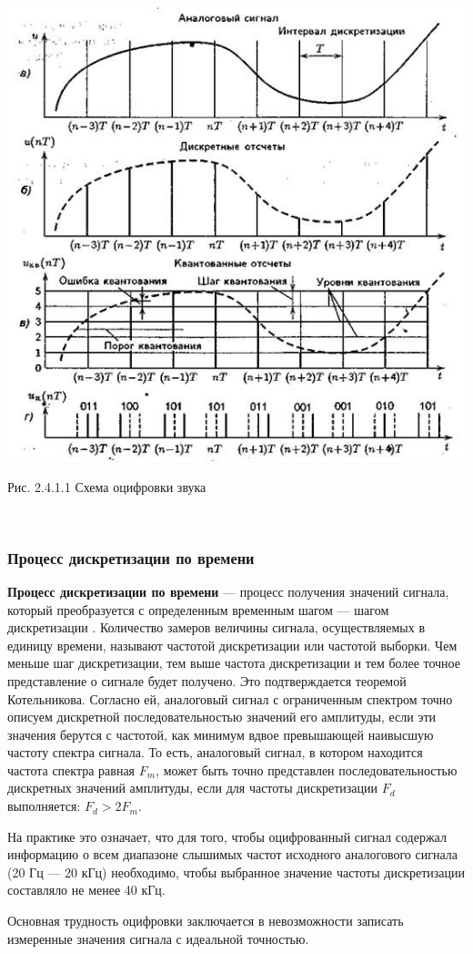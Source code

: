 \documentclass[a4paper]{report}
\begin{document}
~

\includegraphics[scale=0.8]{Analog_to_digi}
{\centering\par{Рис. 2.4.1.1 Схема оцифровки звука}\\}

~
\subsubsection{Процесс дискретизации по времени}
\textbf{Процесс дискретизации по времени} — процесс получения значений сигнала, который преобразуется с определенным временным шагом — шагом дискретизации . Количество замеров величины сигнала, осуществляемых в единицу времени, называют частотой дискретизации или частотой выборки. Чем меньше шаг дискретизации, тем выше частота дискретизации и тем более точное представление о сигнале будет получено.
Это подтверждается теоремой Котельникова. Согласно ей, аналоговый сигнал с ограниченным спектром точно описуем дискретной последовательностью значений его амплитуды, если эти значения берутся с частотой, как минимум вдвое превышающей наивысшую частоту спектра сигнала. То есть, аналоговый сигнал, в котором находится частота спектра равная $F_m$, может быть точно представлен последовательностью дискретных значений амплитуды, если для частоты дискретизации $F_d$ выполняется: $F_d>2F_m$.
\par На практике это означает, что для того, чтобы оцифрованный сигнал содержал информацию о всем диапазоне слышимых частот исходного аналогового сигнала (20 Гц — 20 кГц) необходимо, чтобы выбранное значение частоты дискретизации составляло не менее 40 кГц.
\par Основная трудность оцифровки заключается в невозможности записать измеренные значения сигнала с идеальной точностью.
\end{document}
